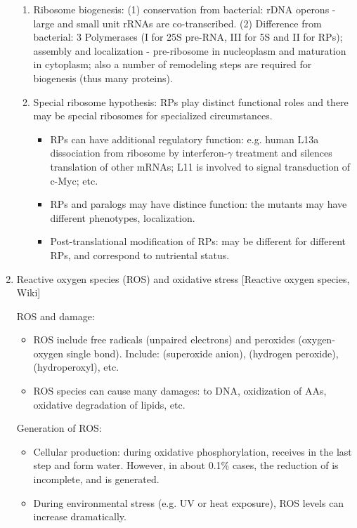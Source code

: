 \documentclass{report}
\begin{document}
\begin{enumerate}
\begin{enumerate}
\item Ribosome biogenesis: (1) conservation from bacterial: rDNA operons - large and small unit rRNAs are co-transcribed. (2) Difference from bacterial: 3 Polymerases (I for 25S pre-RNA, III for 5S and II for RPs); assembly and localization - pre-ribosome in nucleoplasm and maturation in cytoplasm; also a number of remodeling steps are required for biogenesis (thus many proteins). 

\item Special ribosome hypothesis: RPs play distinct functional roles and there may be special ribosomes for specialized circumstances. 
\begin{itemize}
	\item RPs can have additional regulatory function: e.g. human L13a dissociation from ribosome by interferon-$\gamma$ treatment and silences translation of other mRNAs; L11 is involved to signal transduction of c-Myc; etc. 
	\item RPs and paralogs may have distince function: the mutants may have different phenotypes, localization. 
	\item Post-translational modification of RPs: may be different for different RPs, and correspond to nutriental status. 
\end{itemize}

\end{enumerate}

\item{Reactive oxygen species (ROS) and oxidative stress} [Reactive oxygen species, Wiki]

ROS and damage: 
\begin{itemize}
	\item ROS include free radicals (unpaired electrons) and peroxides (oxygen-oxygen single bond). Include:  (superoxide anion),  (hydrogen peroxide),  (hydroperoxyl), etc. 
	\item ROS species can cause many damages: to DNA, oxidization of AAs, oxidative  degradation of lipids, etc. 
\end{itemize}

Generation of ROS: 
\begin{itemize}
	\item Cellular production: during oxidative phosphorylation,  receives  in the last step and form water. However, in about 0.1\% cases, the reduction of  is incomplete, and  is generated. 
	\item During environmental stress (e.g. UV or heat exposure), ROS levels can increase dramatically. 
\end{itemize}


\end{enumerate}
\end{document}
